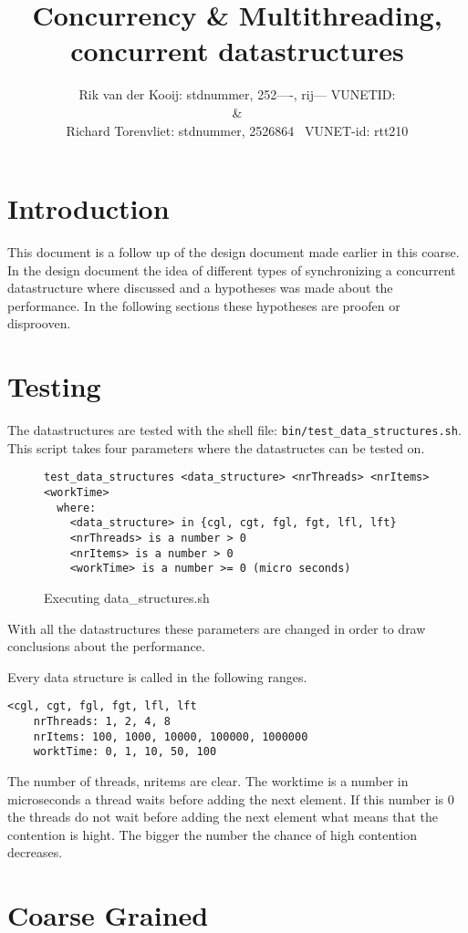 \documentclass[10pt,a4paper]{article}
\author{Rik van der Kooij: stdnummer, 252----, rij--- VUNETID: \\ \&  \\ Richard Torenvliet: stdnummer, 2526864 \ VUNET-id: rtt210}
\title{Concurrency \& Multithreading, concurrent datastructures}
\begin{document}
\maketitle
\tableofcontents
\section{Introduction}
This document is a follow up of the design document made earlier in this coarse. In the design document the idea of different types of synchronizing a concurrent datastructure where discussed and a hypotheses was made about the performance. In the following sections these hypotheses are proofen or disprooven.

\section{Testing}
The datastructures are tested with the shell file: \texttt{bin/test\_data\_structures.sh}. This script takes four parameters where the datastructes can be tested on.

\begin{figure}
\center
\begin{lstlisting}
test_data_structures <data_structure> <nrThreads> <nrItems> <workTime>
  where:
    <data_structure> in {cgl, cgt, fgl, fgt, lfl, lft}
    <nrThreads> is a number > 0
    <nrItems> is a number > 0
    <workTime> is a number >= 0 (micro seconds)
\end{lstlisting}
\caption{Executing data\_structures.sh}
\end{figure}

With all the datastructures these parameters are changed in order to draw conclusions about the performance. 

Every data structure is called in the following ranges.
\begin{lstlisting}
<cgl, cgt, fgl, fgt, lfl, lft
	nrThreads: 1, 2, 4, 8
	nrItems: 100, 1000, 10000, 100000, 1000000
	worktTime: 0, 1, 10, 50, 100
\end{lstlisting}

The number of threads, nritems are clear. The worktime is a number in microseconds a thread waits before adding the next element. If this number is 0 the threads do not wait before adding the next element what means that the contention is hight. The bigger the number the chance of high contention decreases.





\section{Coarse Grained}
\end{document}
